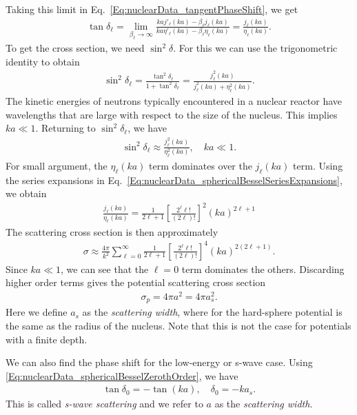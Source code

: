 Taking this limit in Eq.~\eqref{Eq:nuclearData_tangentPhaseShift}, we get
\begin{align} 
  \tan\delta_\ell = \lim_{\beta_\ell \rightarrow \infty} \frac{ ka j'_\ell(ka) - \beta_\ell j_\ell(ka) }{ ka \eta'_\ell(ka) - \beta_\ell \eta_\ell(ka) } = \frac{ j_\ell(ka) }{ \eta_\ell(ka) } .
\end{align}
To get the cross section, we need $\sin^2\delta$. For this we can use the trigonometric identity to obtain
\begin{align}
  \sin^2\delta_\ell = \frac{ \tan^2\delta_\ell }{ 1 + \tan^2\delta_\ell } = \frac{ j^2_\ell(ka) }{ j^2_\ell(ka) + \eta^2_\ell(ka) } .
\end{align}
The kinetic energies of neutrons typically encountered in a nuclear reactor have wavelengths that are large with respect to the size of the nucleus. This implies $k a \ll 1$. Returning to $\sin^2\delta_\ell$, we have
\begin{align}
  \sin^2 \delta_\ell \approx  \frac{ j_\ell^2(ka) }{ \eta_\ell^2(ka) } , \quad ka \ll 1.
\end{align}
For small argument, the $\eta_\ell(ka)$ term dominates over the $j_\ell(ka)$ term. Using the series expansions in Eq.~\eqref{Eq:nuclearData_sphericalBesselSeriesExpansions}, we obtain
\begin{align}
   \frac{ j_\ell(ka) }{ \eta_\ell(ka) } 
  = \frac{1}{2\ell + 1} \left[ \frac{2^\ell \ell !}{ (2\ell)! } \right]^2 (ka)^{2\ell+1}
\end{align}
The scattering cross section is then approximately
\begin{align}
  \sigma \approx \frac{4\pi}{k^2} \sum_{\ell = 0}^\infty \frac{1}{2 \ell + 1 }  \left[ \frac{2^\ell \ell !}{ (2\ell)! } \right]^4 (ka)^{2(2\ell+1)}.
\end{align}
Since $ka \ll 1$, we can see that the $\ell = 0$ term dominates the others. Discarding higher order terms gives the potential scattering cross section
\begin{align}
  \sigma_p = 4\pi a^2 = 4 \pi a_s^2.
\end{align}
Here we define $a_s$ as the \emph{scattering width}, where for the hard-sphere potential is the same as the radius of the nucleus. Note that this is not the case for potentials with a finite depth.

We can also find the phase shift for the low-energy or s-wave case. Using \eqref{Eq:nuclearData_sphericalBesselZerothOrder}, we have
\begin{align} \label{Eq:nuclearData_sWave_PhaseShift_scatterWidth}
  \tan \delta_0 = -\tan(ka) , \quad \delta_0 = -ka_s .
\end{align}
This is called \emph{s-wave scattering} and we refer to $a$ as the \emph{scattering width}. 

